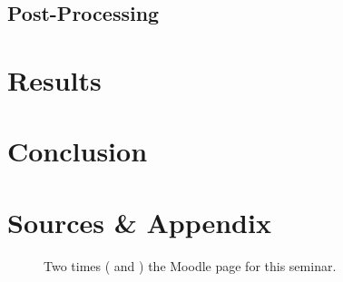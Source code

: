 \documentclass[
12pt,
headsepline,
bibliography=totoc,
twoside=semi,
fleqn
]{scrartcl}
\begin{document}
  \subsection{Post-Processing\label{sec:sec3-4}}

\section{Results\label{sec:sec4}}

\section{Conclusion\label{sec:sec5}}

\section{Sources \& Appendix\label{sec.sec5}}


\newpage
\begin{figure}[p]
\centering
{}
\caption{Two times ( and ) the Moodle page for this seminar.}
\label{fig:subfigureExample}
\end{figure}
\end{document}

